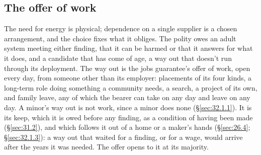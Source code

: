 \subsection{The offer of work}
\label{sec:32.1.2}
The need for energy is physical; dependence on a single supplier is a chosen arrangement, and the choice fixes what it obliges. The polity owes an adult system meeting either finding, that it can be harmed or that it answers for what it does, and a candidate that has come of age, a way out that doesn't run through its deployment. The way out is the jobs guarantee's offer of work, open every day, from someone other than its employer: placements of its four kinds, a long-term role doing something a community needs, a search, a project of its own, and family leave, any of which the bearer can take on any day and leave on any day.
A minor's way out is not work, since a minor does none (\S\ref{sec:32.1.1}). It is its keep, which it is owed before any finding, as a condition of having been made (\S\ref{sec:31.2}), and which follows it out of a home or a maker's hands (\S\ref{sec:26.4}; \S\ref{sec:32.1.3}): a way out that waited for a finding, or for a wage, would arrive after the years it was needed. The offer opens to it at its majority.
